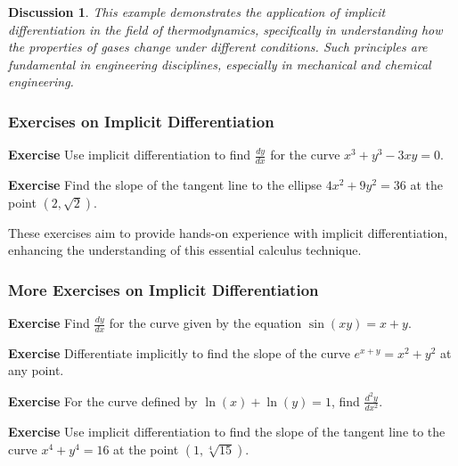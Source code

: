 \documentclass[a4paper,12pt]{book}
\newenvironment{exercise}[1][]
  {\par\medskip\noindent\textbf{Exercise #1} \rmfamily}
  {\medskip}
\newcounter{example}
\newtheorem{discussion}{Discussion}
\begin{document}
\begin{discussion}
This example demonstrates the application of implicit differentiation in the field of thermodynamics, specifically in understanding how the properties of gases change under different conditions. Such principles are fundamental in engineering disciplines, especially in mechanical and chemical engineering.
\end{discussion}

\subsubsection*{Exercises on Implicit Differentiation}

\begin{exercise}
Use implicit differentiation to find \( \frac{dy}{dx} \) for the curve \( x^3 + y^3 - 3xy = 0 \).
\end{exercise}

\begin{exercise}
Find the slope of the tangent line to the ellipse \( 4x^2 + 9y^2 = 36 \) at the point \( (2, \sqrt{2}) \).
\end{exercise}

These exercises aim to provide hands-on experience with implicit differentiation, enhancing the understanding of this essential calculus technique.

\subsubsection*{More Exercises on Implicit Differentiation}

\begin{exercise}
Find \( \frac{dy}{dx} \) for the curve given by the equation \( \sin(xy) = x + y \).
\end{exercise}

\begin{exercise}
Differentiate implicitly to find the slope of the curve \( e^{x+y} = x^2 + y^2 \) at any point.
\end{exercise}

\begin{exercise}
For the curve defined by \( \ln(x) + \ln(y) = 1 \), find \( \frac{d^2y}{dx^2} \).
\end{exercise}

\begin{exercise}
Use implicit differentiation to find the slope of the tangent line to the curve \( x^4 + y^4 = 16 \) at the point \( (1, \sqrt[4]{15}) \).
\end{exercise}
\end{document}
